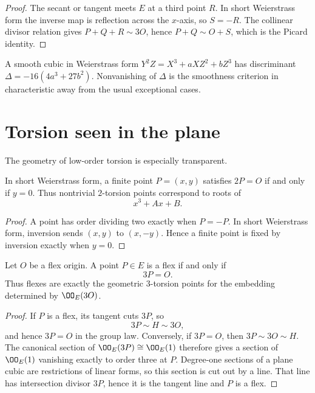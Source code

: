 \begin{proof}
The secant or tangent meets \(E\) at a third point \(R\).  In short Weierstrass form the inverse map is reflection across the \(x\)-axis, so \(S=-R\).  The collinear divisor relation gives \(P+Q+R\sim3O\), hence \(P+Q\sim O+S\), which is the Picard identity.
\end{proof}



\begin{example}\label{ex:vi43-expand-03}
A smooth cubic in Weierstrass form $Y^2Z=X^3+aXZ^2+bZ^3$ has discriminant $\Delta=-16(4a^3+27b^2)$.  Nonvanishing of $\Delta$ is the smoothness criterion in characteristic away from the usual exceptional cases.
\end{example}
\section{Torsion seen in the plane}

The geometry of low-order torsion is especially transparent.

\begin{proposition}\label{prop:vi43-two-torsion}
In short Weierstrass form, a finite point \(P=(x,y)\) satisfies \(2P=O\) if and only if \(y=0\).  Thus nontrivial \(2\)-torsion points correspond to roots of
\[
  x^3+Ax+B.
\]
\end{proposition}

\begin{proof}
A point has order dividing two exactly when \(P=-P\).  In short Weierstrass form, inversion sends \( (x,y) \) to \( (x,-y) \).  Hence a finite point is fixed by inversion exactly when \(y=0\).
\end{proof}

\begin{proposition}\label{prop:vi43-flex-three-torsion}
Let \(O\) be a flex origin.  A point \(P\in E\) is a flex if and only if
\[
  3P=O.
\]
Thus flexes are exactly the geometric \(3\)-torsion points for the embedding determined by \(\OO_E(3O)\).
\end{proposition}

\begin{proof}
If \(P\) is a flex, its tangent cuts \(3P\), so
\[
  3P\sim H\sim3O,
\]
and hence \(3P=O\) in the group law.  Conversely, if \(3P=O\), then \(3P\sim3O\sim H\).  The canonical section of \(\OO_E(3P)\cong\OO_E(1)\) therefore gives a section of \(\OO_E(1)\) vanishing exactly to order three at \(P\).  Degree-one sections of a plane cubic are restrictions of linear forms, so this section is cut out by a line.  That line has intersection divisor \(3P\), hence it is the tangent line and \(P\) is a flex.
\end{proof}

